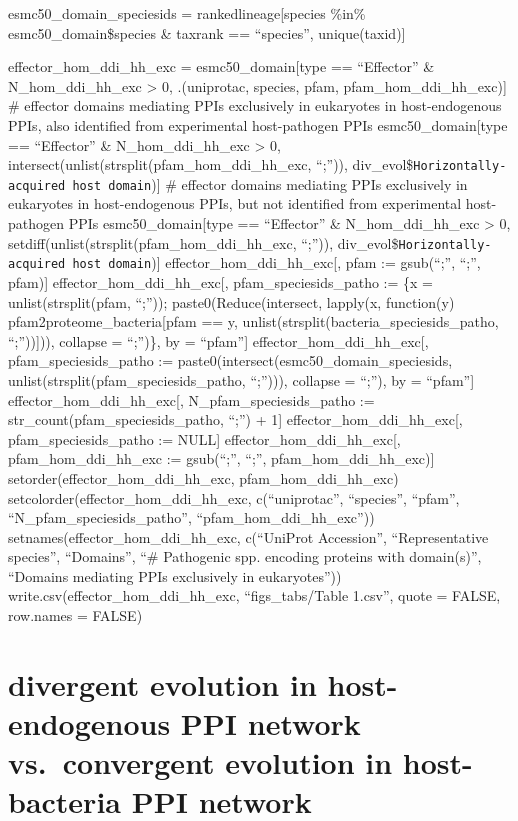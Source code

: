 \documentclass[
]{article}
\begin{document}
esmc50\_domain\_speciesids = rankedlineage{[}species \%in\%
esmc50\_domain\$species \& taxrank == ``species'', unique(taxid){]}

effector\_hom\_ddi\_hh\_exc = esmc50\_domain{[}type == ``Effector'' \&
N\_hom\_ddi\_hh\_exc \textgreater{} 0, .(uniprotac, species, pfam,
pfam\_hom\_ddi\_hh\_exc){]} \# effector domains mediating PPIs
exclusively in eukaryotes in host-endogenous PPIs, also identified from
experimental host-pathogen PPIs esmc50\_domain{[}type == ``Effector'' \&
N\_hom\_ddi\_hh\_exc \textgreater{} 0,
intersect(unlist(strsplit(pfam\_hom\_ddi\_hh\_exc, ``;'')),
div\_evol\$\texttt{Horizontally-acquired\ host\ domain}){]} \# effector
domains mediating PPIs exclusively in eukaryotes in host-endogenous
PPIs, but not identified from experimental host-pathogen PPIs
esmc50\_domain{[}type == ``Effector'' \& N\_hom\_ddi\_hh\_exc
\textgreater{} 0, setdiff(unlist(strsplit(pfam\_hom\_ddi\_hh\_exc,
``;'')), div\_evol\$\texttt{Horizontally-acquired\ host\ domain}){]}
effector\_hom\_ddi\_hh\_exc{[}, pfam := gsub(``;'', ``;'', pfam){]}
effector\_hom\_ddi\_hh\_exc{[}, pfam\_speciesids\_patho := \{x =
unlist(strsplit(pfam, ``;'')); paste0(Reduce(intersect, lapply(x,
function(y) pfam2proteome\_bacteria{[}pfam == y,
unlist(strsplit(bacteria\_speciesids\_patho, ``;'')){]})), collapse =
``;'')\}, by = ``pfam''{]} effector\_hom\_ddi\_hh\_exc{[},
pfam\_speciesids\_patho := paste0(intersect(esmc50\_domain\_speciesids,
unlist(strsplit(pfam\_speciesids\_patho, ``;''))), collapse = ``;''), by
= ``pfam''{]} effector\_hom\_ddi\_hh\_exc{[}, N\_pfam\_speciesids\_patho
:= str\_count(pfam\_speciesids\_patho, ``;'') + 1{]}
effector\_hom\_ddi\_hh\_exc{[}, pfam\_speciesids\_patho := NULL{]}
effector\_hom\_ddi\_hh\_exc{[}, pfam\_hom\_ddi\_hh\_exc := gsub(``;'',
``;'', pfam\_hom\_ddi\_hh\_exc){]} setorder(effector\_hom\_ddi\_hh\_exc,
pfam\_hom\_ddi\_hh\_exc) setcolorder(effector\_hom\_ddi\_hh\_exc,
c(``uniprotac'', ``species'', ``pfam'', ``N\_pfam\_speciesids\_patho'',
``pfam\_hom\_ddi\_hh\_exc'')) setnames(effector\_hom\_ddi\_hh\_exc,
c(``UniProt Accession'', ``Representative species'', ``Domains'', ``\#
Pathogenic spp. encoding proteins with domain(s)'', ``Domains mediating
PPIs exclusively in eukaryotes''))
write.csv(effector\_hom\_ddi\_hh\_exc, ``figs\_tabs/Table 1.csv'', quote
= FALSE, row.names = FALSE)

\hypertarget{divergent-evolution-in-host-endogenous-ppi-network-vs.-convergent-evolution-in-host-bacteria-ppi-network}{%
\section{divergent evolution in host-endogenous PPI network
vs.~convergent evolution in host-bacteria PPI
network}\label{divergent-evolution-in-host-endogenous-ppi-network-vs.-convergent-evolution-in-host-bacteria-ppi-network}}
\end{document}
